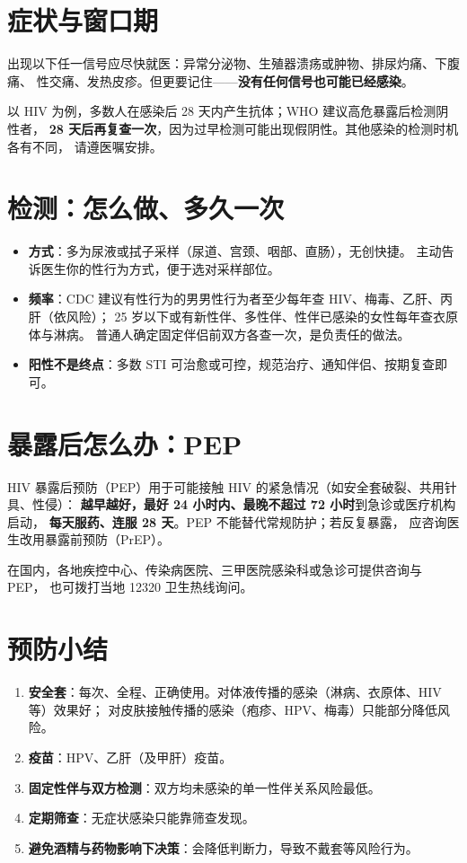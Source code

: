 \section{症状与窗口期}

出现以下任一信号应尽快就医：异常分泌物、生殖器溃疡或肿物、排尿灼痛、下腹痛、
性交痛、发热皮疹。但更要记住——\textbf{没有任何信号也可能已经感染}。

以 HIV 为例，多数人在感染后 28 天内产生抗体；WHO 建议高危暴露后检测阴性者，
\textbf{28 天后再复查一次}，因为过早检测可能出现假阴性。其他感染的检测时机各有不同，
请遵医嘱安排。

\section{检测：怎么做、多久一次}

\begin{itemize}[leftmargin=2em]
  \item \textbf{方式}：多为尿液或拭子采样（尿道、宫颈、咽部、直肠），无创快捷。
        主动告诉医生你的性行为方式，便于选对采样部位。
  \item \textbf{频率}：CDC 建议有性行为的男男性行为者至少每年查 HIV、梅毒、乙肝、丙肝（依风险）；
        25 岁以下或有新性伴、多性伴、性伴已感染的女性每年查衣原体与淋病。
        普通人确定固定伴侣前双方各查一次，是负责任的做法。
  \item \textbf{阳性不是终点}：多数 STI 可治愈或可控，规范治疗、通知伴侣、按期复查即可。
\end{itemize}

\section{暴露后怎么办：PEP}

HIV 暴露后预防（PEP）用于可能接触 HIV 的紧急情况（如安全套破裂、共用针具、性侵）：
\textbf{越早越好，最好 24 小时内、最晚不超过 72 小时}到急诊或医疗机构启动，
\textbf{每天服药、连服 28 天}。PEP 不能替代常规防护；若反复暴露，
应咨询医生改用暴露前预防（PrEP）。

在国内，各地疾控中心、传染病医院、三甲医院感染科或急诊可提供咨询与 PEP，
也可拨打当地 12320 卫生热线询问。

\section{预防小结}

\begin{enumerate}[leftmargin=2em,itemsep=0.3em]
  \item \textbf{安全套}：每次、全程、正确使用。对体液传播的感染（淋病、衣原体、HIV 等）效果好；
        对皮肤接触传播的感染（疱疹、HPV、梅毒）只能部分降低风险。
  \item \textbf{疫苗}：HPV、乙肝（及甲肝）疫苗。
  \item \textbf{固定性伴与双方检测}：双方均未感染的单一性伴关系风险最低。
  \item \textbf{定期筛查}：无症状感染只能靠筛查发现。
  \item \textbf{避免酒精与药物影响下决策}：会降低判断力，导致不戴套等风险行为。
\end{enumerate}

